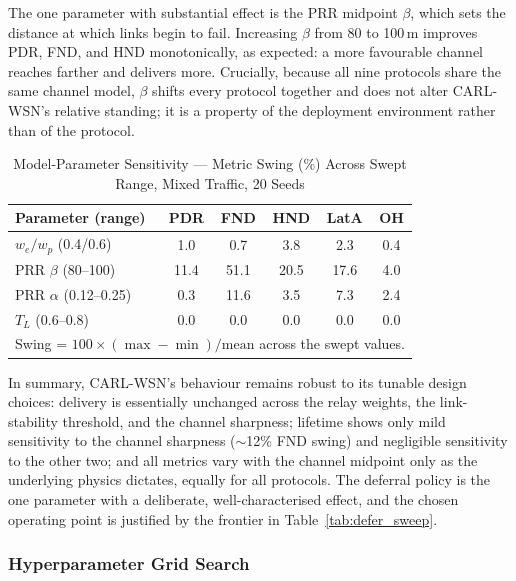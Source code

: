\documentclass[12pt]{article}
\begin{document}
The one parameter with substantial effect is the PRR midpoint
$\beta$, which sets the distance at which links begin to fail.
Increasing $\beta$ from 80 to 100\,m improves PDR, FND, and HND
monotonically, as expected: a more favourable channel reaches
farther and delivers more. Crucially, because all nine protocols
share the same channel model, $\beta$ shifts every protocol together
and does not alter CARL-WSN's relative standing; it is a property of
the deployment environment rather than of the protocol.

\begin{table}[!t]
\renewcommand{\arraystretch}{1.2}
\caption{Model-Parameter Sensitivity --- Metric Swing (\%) Across Swept Range, Mixed Traffic, 20 Seeds}
\label{tab:model_sweep}
\centering
\begin{tabular}{lccccc}
\hline
\textbf{Parameter (range)} & \textbf{PDR} & \textbf{FND} & \textbf{HND} & \textbf{LatA} & \textbf{OH} \\
\hline
$w_e/w_p$ (0.4/0.6)          & 1.0 & 0.7 & 3.8 & 2.3 & 0.4 \\
PRR $\beta$ (80--100)        & 11.4 & 51.1 & 20.5 & 17.6 & 4.0 \\
PRR $\alpha$ (0.12--0.25)    & 0.3 & 11.6 & 3.5 & 7.3 & 2.4 \\
$T_L$ (0.6--0.8)             & 0.0 & 0.0 & 0.0 & 0.0 & 0.0 \\
\hline
\multicolumn{6}{l}{\footnotesize Swing = $100 \times (\max - \min)/\mathrm{mean}$ across the swept values.} \\
\end{tabular}
\end{table}

In summary, CARL-WSN's behaviour remains robust to its tunable
design choices: delivery is essentially unchanged across the relay
weights, the link-stability threshold, and the channel sharpness;
lifetime shows only mild sensitivity to the channel sharpness
($\sim$12\% FND swing) and negligible sensitivity to the other two;
and all metrics vary with the channel midpoint only as the
underlying physics dictates, equally for all protocols. The deferral policy is
the one parameter with a deliberate, well-characterised effect, and
the chosen operating point is justified by the frontier in
Table~\ref{tab:defer_sweep}.

\subsubsection{Hyperparameter Grid Search}
\end{document}
